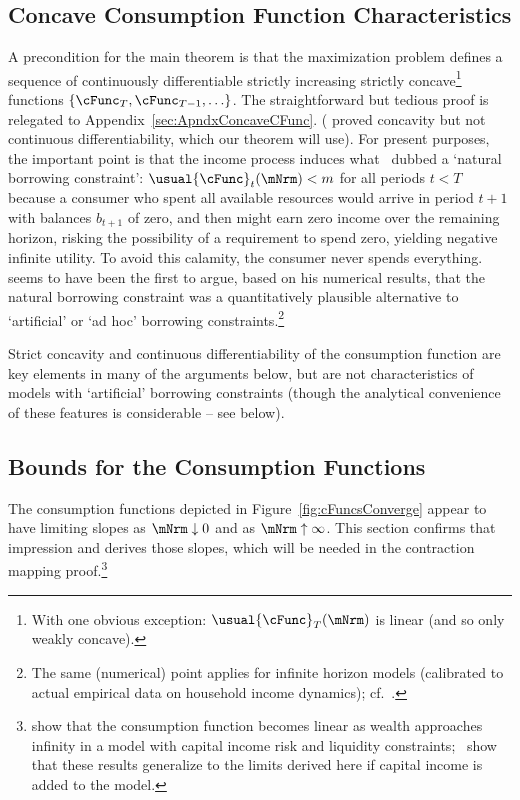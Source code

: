 \documentclass[BufferStockTheory]{subfiles}
\begin{document}
\hypertarget{\figFile}{}
\hypertarget{\figName}{}

\subsection{Concave Consumption Function Characteristics}\label{sec:cExists}

A precondition for the main theorem is that the maximization problem defines a sequence of continuously differentiable strictly increasing strictly concave\footnote{With one obvious exception: $\usual{\cFunc}_{T}(\mNrm)$ is linear (and so only weakly concave).} functions $\{\cFunc_{T},\cFunc_{T-1},\ldots\}$.  The straightforward but tedious proof is relegated to Appendix~\ref{sec:ApndxConcaveCFunc}.  (\cite{ckConcavity} proved concavity but not continuous differentiability, which our theorem will use). For present purposes, the important point is that the income process induces what~\cite{aiyagari:ge} dubbed a `natural borrowing constraint':  $\usual{\cFunc}_{t}(\mNrm) < m$ for all periods $t < T$ because a consumer who spent all available resources would arrive in period $t+1$ with balances $b_{t+1}$ of zero, and then might earn zero income over the remaining horizon, risking the possibility of a requirement to spend zero, yielding negative infinite utility.  To avoid this calamity, the consumer never spends everything.~~\cite{zeldesStochastic} seems to have been the first to argue, based on his numerical results, that the natural borrowing constraint was a quantitatively plausible alternative to `artificial' or `ad hoc' borrowing constraints.\footnote{The same (numerical) point applies for infinite horizon models (calibrated to actual empirical data on household income dynamics); cf.~\cite{carrollBrookings}.}

Strict concavity and continuous differentiability of the consumption function are key elements in many of the arguments below, but are not characteristics of models with `artificial' borrowing constraints (though the analytical convenience of these features is considerable -- see below).

\hypertarget{Bounds-for-the-Consumption-Functions}{}
\subsection{Bounds for the Consumption Functions}\label{subsec:cFuncBounds}

The consumption functions depicted in Figure~\ref{fig:cFuncsConverge} appear to have limiting slopes as $\mNrm \downarrow 0$ and as $\mNrm \uparrow \infty$.  This section confirms that impression and derives those slopes, which will be needed in the contraction mapping proof.\footnote{\cite{benhabibWealth} show that the consumption function becomes linear as wealth approaches infinity in a model with capital income risk and liquidity constraints;~\cite{maTodaRich} show that these results generalize to the limits derived here if capital income is added to the model.}
\end{document}
